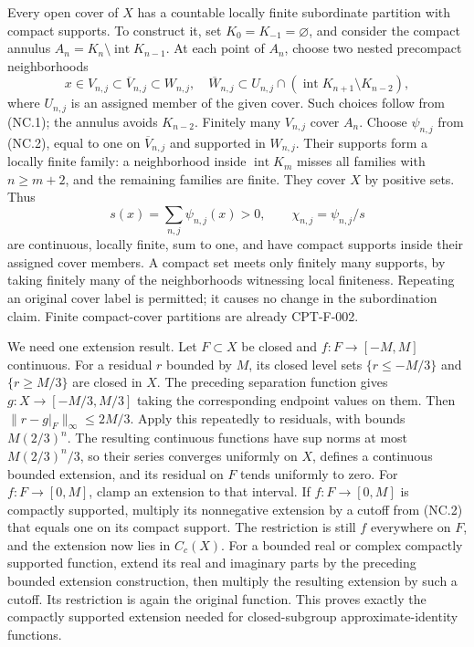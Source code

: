 \documentclass[
  11pt,
]{article}
\begin{document}
Every open cover of \(X\) has a countable locally finite subordinate
partition with compact supports. To construct it, set
\(K_0=K_{-1}=\varnothing\), and consider the compact annulus
\(A_n=K_n\setminus\operatorname{int}K_{n-1}\). At each point of \(A_n\),
choose two nested precompact neighborhoods \[
 x\in V_{n,j}\subset\overline V_{n,j}\subset W_{n,j},
 \quad
 \overline W_{n,j}\subset
 U_{n,j}\cap(\operatorname{int}K_{n+1}\setminus K_{n-2}),
\] where \(U_{n,j}\) is an assigned member of the given cover. Such
choices follow from (NC.1); the annulus avoids \(K_{n-2}\). Finitely
many \(V_{n,j}\) cover \(A_n\). Choose \(\psi_{n,j}\) from (NC.2), equal
to one on \(\overline V_{n,j}\) and supported in \(W_{n,j}\). Their
supports form a locally finite family: a neighborhood inside
\(\operatorname{int}K_m\) misses all families with \(n\geq m+2\), and
the remaining families are finite. They cover \(X\) by positive sets.
Thus \[
 s(x)=\sum_{n,j}\psi_{n,j}(x)>0,\qquad
 \chi_{n,j}=\psi_{n,j}/s
\] are continuous, locally finite, sum to one, and have compact supports
inside their assigned cover members. A compact set meets only finitely
many supports, by taking finitely many of the neighborhoods witnessing
local finiteness. Repeating an original cover label is permitted; it
causes no change in the subordination claim. Finite compact-cover
partitions are already CPT-F-002.

We need one extension result. Let \(F\subset X\) be closed and
\(f:F\to[-M,M]\) continuous. For a residual \(r\) bounded by \(M\), its
closed level sets \(\{r\leq-M/3\}\) and \(\{r\geq M/3\}\) are closed in
\(X\). The preceding separation function gives \(g:X\to[-M/3,M/3]\)
taking the corresponding endpoint values on them. Then
\(\|r-g|_F\|_\infty\leq2M/3\). Apply this repeatedly to residuals, with
bounds \(M(2/3)^n\). The resulting continuous functions have sup norms
at most \(M(2/3)^n/3\), so their series converges uniformly on \(X\),
defines a continuous bounded extension, and its residual on \(F\) tends
uniformly to zero. For \(f:F\to[0,M]\), clamp an extension to that
interval. If \(f:F\to[0,M]\) is compactly supported, multiply its
nonnegative extension by a cutoff from (NC.2) that equals one on its
compact support. The restriction is still \(f\) everywhere on \(F\), and
the extension now lies in \(C_c(X)\). For a bounded real or complex
compactly supported function, extend its real and imaginary parts by the
preceding bounded extension construction, then multiply the resulting
extension by such a cutoff. Its restriction is again the original
function. This proves exactly the compactly supported extension needed
for closed-subgroup approximate-identity functions.
\end{document}
